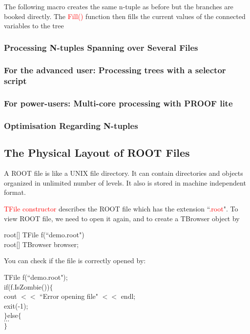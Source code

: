 \documentclass[12pt,a4paper]{article}
\begin{document}
The following macro creates the same n-tuple as before but the branches are booked directly. The \textcolor{red}{Fill()} function then fills the current values of the connected variables to the tree

\subsubsection{Processing N-tuples Spanning over Several Files}


\subsubsection{For the advanced user: Processing trees with a selector script}



\subsubsection{For power-users: Multi-core processing with PROOF lite}



\subsubsection{Optimisation Regarding N-tuples}





\subsection{The Physical Layout of ROOT Files}
A ROOT file is like a UNIX file directory. It can contain directories and objects organized in unlimited number of levels.  It also is stored in machine independent format. 

\textcolor{red}{TFile constructor} describes the ROOT file which has the extension ``\textcolor{red}{.root}". To view ROOT file, we need to open it again, and to create a TBrowser object by

root[] TFile f(``demo.root") \\
root[] TBrowser browser;

You can check if the file is correctly opened by:

TFile f(``demo.root"); \\
if(f.IsZombie())$\{$ \\
cout $<<$ ``Error opening file" $<<$ endl; \\
exit(-1); \\
$\}$else$\{$ \\
$\cdots$ \\
$\}$ 
\end{document}
